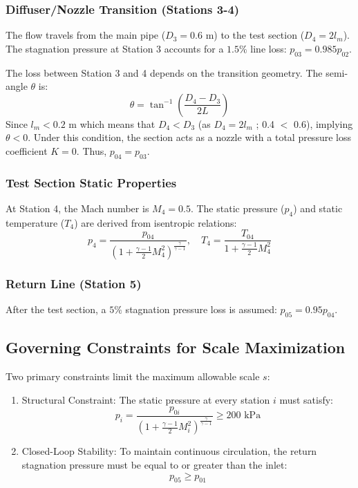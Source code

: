\documentclass[12pt]{article}
\begin{document}
\subsubsection{Diffuser/Nozzle Transition (Stations 3-4)}
The flow travels from the main pipe ($D_3 = 0.6$ m) to the test section ($D_4 = 2l_m$). The stagnation pressure at Station 3 accounts for a $1.5\%$ line loss: $p_{03} = 0.985 p_{02}$. 

The loss between Station 3 and 4 depends on the transition geometry. The semi-angle $\theta$ is:
\begin{equation}
    \theta = \tan^{-1} \left( \frac{D_4 - D_3}{2L} \right)
\end{equation}
Since $l_m < 0.2$ m which means that $D_4 < D_3$ (as $D_4 = 2l_m$ ; 0.4 $<$ 0.6), implying $\theta < 0$. Under this condition, the section acts as a nozzle with a total pressure loss coefficient $K = 0$. Thus, $p_{04} = p_{03}$.

\subsubsection{Test Section Static Properties}
At Station 4, the Mach number is $M_4 = 0.5$. The static pressure ($p_4$) and static temperature ($T_4$) are derived from isentropic relations:
\begin{equation}
    p_4 = \frac{p_{04}}{\left(1 + \frac{\gamma-1}{2}M_4^2\right)^{\frac{\gamma}{\gamma-1}}}, \quad T_4 = \frac{T_{04}}{1 + \frac{\gamma-1}{2}M_4^2}
\end{equation}

\subsubsection{Return Line (Station 5)}
After the test section, a $5\%$ stagnation pressure loss is assumed: $p_{05} = 0.95 p_{04}$. 

\subsection{Governing Constraints for Scale Maximization}
Two primary constraints limit the maximum allowable scale $s$:
\begin{enumerate}
    \item {Structural Constraint:} The static pressure at every station $i$ must satisfy:
    \begin{equation}
        p_i = \frac{p_{0i}}{(1 + \frac{\gamma-1}{2}M_i^2)^{\frac{\gamma}{\gamma-1}}} \geq 200 \text{ kPa}
    \end{equation}

    \item {Closed-Loop Stability:} To maintain continuous circulation, the return stagnation pressure must be equal to or greater than the inlet:
    \begin{equation}
        p_{05} \geq p_{01}
    \end{equation}
\end{enumerate}
\end{document}
